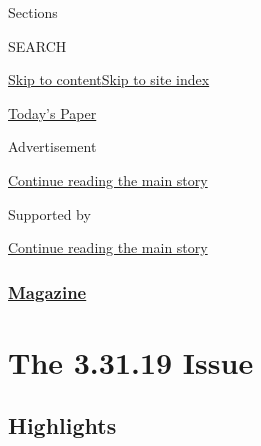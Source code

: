 Sections

SEARCH

\protect\hyperlink{site-content}{Skip to
content}\protect\hyperlink{site-index}{Skip to site index}

\href{https://myaccount.nytimes3xbfgragh.onion/auth/login?response_type=cookie\&client_id=vi}{}

\href{https://www.nytimes3xbfgragh.onion/section/todayspaper}{Today's
Paper}

Advertisement

\protect\hyperlink{after-top}{Continue reading the main story}

Supported by

\protect\hyperlink{after-sponsor}{Continue reading the main story}

\hypertarget{magazine}{%
\subsubsection{\texorpdfstring{\href{/section/magazine}{Magazine}}{Magazine}}\label{magazine}}

\hypertarget{the-33119-issue}{%
\section{The 3.31.19 Issue}\label{the-33119-issue}}

\hypertarget{highlights}{%
\subsection{Highlights}\label{highlights}}

